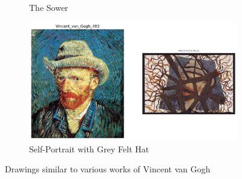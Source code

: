 \begin{figure}
\begin{subfigure}[b]{0.45\textwidth}
         \caption{The Sower}
     \end{subfigure}
     \hfil
     \begin{subfigure}[b]{0.45\textwidth}
         \centering
         \includegraphics[width=\textwidth]{images/example_pairs/Vincent_van_Gogh_483.png}
         \caption{Self-Portrait with Grey Felt Hat}
     \end{subfigure}
    \caption{Drawings similar to various works of Vincent van Gogh}
    \label{fig:pairs-example-1}
\end{figure}

